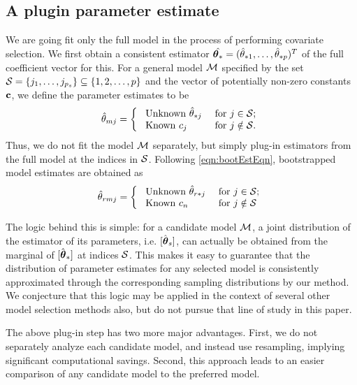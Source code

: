 \subsection{A plugin parameter estimate}

We are going fit only the full model in the process of performing covariate selection. We first obtain a consistent estimator $\hat{{\boldsymbol{\theta}}_*} = (\hat{\theta}_{* 1}, \ldots, \hat{\theta}_{ * p})^T$ of the full coefficient vector for this. For a general model ${\cal{M}}$ specified by the set ${\cal{S}} = \{ j_{1}, \ldots, j_{ p_{s}}\} \subseteq \{1, 2, \ldots , p \}$ and the vector of potentially non-zero constants ${\bf{c}}$, we define the parameter estimates to be
%
\begin{align} 
 \hat{\theta}_{m j} = \left\{ \begin{array}{ll}
 \text{ Unknown} \ \hat{\theta}_{* j} & \text{ for } 
 			j \in {\cal{S}}; \\
 \text{ Known} \  c_{j} & \text{ for } j \notin {\cal{S}}.
\end{array}
\right.
\end{align}
%
Thus, we do not fit the  model ${\cal{M}}$ separately, but simply plug-in estimators from the full model at the indices in ${\cal{S}}$. Following \ref{eqn:bootEstEqn}, bootstrapped model estimates are obtained as
%
\begin{align}
 \hat{\theta}_{r m j} = \left\{ \begin{array}{ll}
 \text{ Unknown} \ \hat{\theta}_{r * j} & \text{ for } 
 			j \in {\cal{S}}; \\
 \text{ Known} \  c_{n} & \text{ for } j \notin {\cal{S}}
\end{array}
\right.
\end{align}


The logic behind this is simple: for a candidate model ${\cal{M}}$, a joint distribution of the estimator of its parameters, i.e. $[\hat{{\boldsymbol{\theta}}}_{s}]$, can actually be obtained from the marginal of $[ \hat{{\boldsymbol{\theta}}}_* ] $ at indices ${\cal{S}}$. This makes it easy to guarantee that the distribution of parameter estimates for any selected model is consistently approximated through the corresponding sampling distributions by our method. We conjecture that this logic may be applied in the context of several other model selection methods also, but do not pursue that line of study in this paper. 

The above plug-in step has two more major advantages. First, we do not separately analyze each candidate model, and instead use resampling, implying significant computational savings. Second, this approach leads to an easier comparison of any candidate model to the preferred model.

